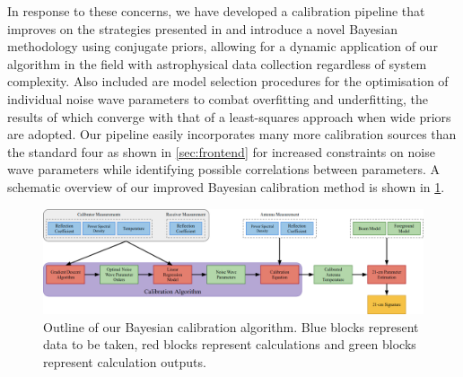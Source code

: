 In response to these concerns, we have developed a calibration pipeline that improves on the strategies presented in \citet{edgesCal} and introduce a novel Bayesian methodology using conjugate priors, allowing for a dynamic application of our algorithm in the field with astrophysical data collection regardless of system complexity. Also included are model selection procedures for the optimisation of  individual noise wave parameters to combat overfitting and underfitting, the results of which converge with that of a least-squares approach when wide priors are adopted. Our pipeline easily incorporates many more calibration sources than the standard four as shown in \cref{sec:frontend} for increased constraints on noise wave parameters while identifying possible correlations between parameters. A schematic overview of our improved Bayesian calibration method is shown in \cref{fig:cal_flowchart}.
\begin{figure}
    \centering
    \includegraphics[width=\textwidth]{cal_flowchart}
    \caption{Outline of our Bayesian calibration algorithm. Blue blocks represent data to be taken, red blocks represent calculations and green blocks represent calculation outputs.}
    \label{fig:cal_flowchart}
\end{figure}

